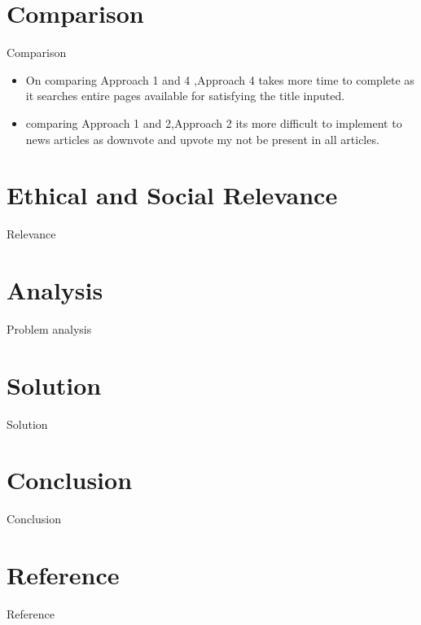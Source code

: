 \documentclass{beamer}
\begin{document}
	\section{Comparison}
	\begin{frame}{Comparison}
	\begin{itemize}
            \item On comparing Approach 1 and 4 ,Approach 4 takes more time to complete as it searches entire pages available for satisfying the title inputed.      
            \item comparing Approach 1 and 2,Approach 2 its more difficult to implement to news articles as downvote and upvote my not be present in all articles.
  	    \end{itemize}

	\end{frame}
	\section{Ethical and Social Relevance}
	\begin{frame}{Relevance}
	\end{frame}
	\section{Analysis}
	\begin{frame}{Problem analysis}
	\end{frame}
	\section{Solution}
	\begin{frame}{Solution}
	\end{frame}
	\section{Conclusion}
	\begin{frame}{Conclusion}
	\end{frame}
	\section{Reference}
	\begin{frame}{Reference}
	\end{frame}
\end{document}
